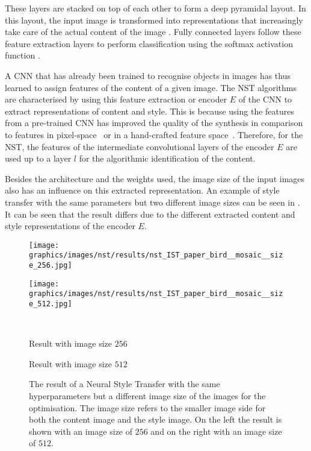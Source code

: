 These layers are stacked on top of each other to form a deep pyramidal layout. In this layout, the input image is transformed into representations that increasingly take care of the actual content of the image \cite{ZF2014}. Fully connected layers follow these feature extraction layers to perform classification using the softmax activation function \cite{Alp2020}. 

A \gls{CNN} that has already been trained to recognise objects in images has thus learned to assign features of the content of a given image. The \gls{NST} algorithms are characterised by using this feature extraction or encoder $E$ of the \gls{CNN} to extract representations of content and style. This is because using the features from a pre-trained \gls{CNN} has improved the quality of the synthesis in comparison to features in pixel-space~\cite{EL1999} or in a hand-crafted feature space~\cite{PS2000}. Therefore, for the \gls{NST}, the features of the intermediate convolutional layers of the encoder $E$ are used up to a layer $l$ for the algorithmic identification of the content. 

Besides the architecture and the weights used, the image size of the input images also has an influence on this extracted representation. An example of style transfer with the same parameters but two different image sizes can be seen in . It can be seen that the result differs due to the different extracted content and style representations of the encoder $E$.
\begin{figure}[h]
	\centering
	\begin{minipage}{.5\textwidth}
		\centering
		\texttt{[image: graphics/images/nst/results/nst\_IST\_paper\_bird\_\_mosaic\_\_size\_256.jpg]}
	\end{minipage}%
	\begin{minipage}{.5\textwidth}
		\centering
		\texttt{[image: graphics/images/nst/results/nst\_IST\_paper\_bird\_\_mosaic\_\_size\_512.jpg]}
	\end{minipage}\\ \vspace{0.15cm}
	\begin{minipage}{.5\textwidth}
		\centering
		Result with image size $256$
	\end{minipage}%
	\begin{minipage}{.5\textwidth}
		\centering
		Result with image size $512$
	\end{minipage}
	\caption{The result of a Neural Style Transfer with the same hyperparameters but a different image size of the images for the optimisation. The image size refers to the smaller image side for both the content image and the style image. On the left the result is shown with an image size of $256$ and on the right with an image size of $512$.}
	\label{fig:diff_size_nst}
\end{figure}

